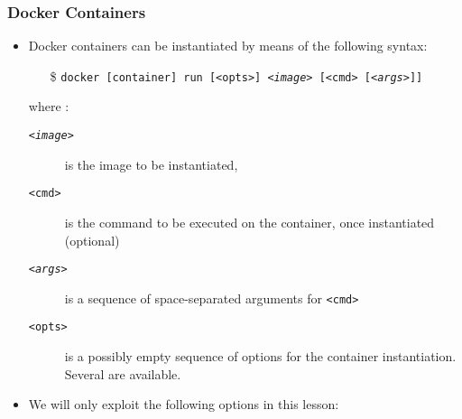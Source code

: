 \documentclass{beamer}\mode<presentation>{\usetheme{AMSBolognaFC}}
\begin{document}
\begin{frame}[allowframebreaks]
\frametitle{Docker Containers}

\begin{itemize}
    \item Docker containers can be instantiated by means of the following syntax:
    \begin{itemize}
        \item[\$] \texttt{docker [container] \alert{run} [\alert{<opts>}] \alert{\textit{<image>}} [\alert{<cmd>} [\textit{\alert{<args>}}]]}
    \end{itemize}
    where :
    \begin{description}
        \item[\texttt{\textit{<image>}}] is the image to be instantiated,
        \item[\texttt{<cmd>}] is the command to be executed on the container, once instantiated (optional)
        \item[\texttt{\textit{<args>}}] is a sequence of space-separated arguments for \texttt{<cmd>}
        \item[\texttt{<opts>}] is a possibly empty sequence of options for the container instantiation. Several are available.
    \end{description}

    \framebreak

    \item We will only exploit the following options in this lesson:
\end{itemize}
\end{frame}
\end{document}
